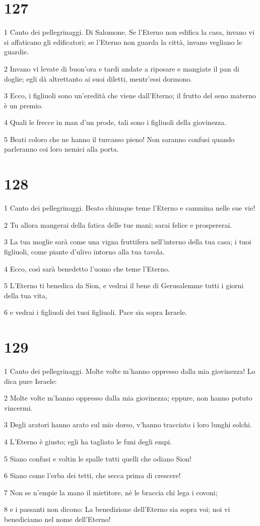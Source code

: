 \chapter{127}

\par 1 Canto dei pellegrinaggi. Di Salomone. Se l'Eterno non edifica la casa, invano vi si affaticano gli edificatori; se l'Eterno non guarda la città, invano vegliano le guardie.
\par 2 Invano vi levate di buon'ora e tardi andate a riposare e mangiate il pan di doglie; egli dà altrettanto ai suoi diletti, mentr'essi dormono.
\par 3 Ecco, i figliuoli sono un'eredità che viene dall'Eterno; il frutto del seno materno è un premio.
\par 4 Quali le frecce in man d'un prode, tali sono i figliuoli della giovinezza.
\par 5 Beati coloro che ne hanno il turcasso pieno! Non saranno confusi quando parleranno coi loro nemici alla porta.

\chapter{128}

\par 1 Canto dei pellegrinaggi. Beato chiunque teme l'Eterno e cammina nelle sue vie!
\par 2 Tu allora mangerai della fatica delle tue mani; sarai felice e prospererai.
\par 3 La tua moglie sarà come una vigna fruttifera nell'interno della tua casa; i tuoi figliuoli, come piante d'ulivo intorno alla tua tavola.
\par 4 Ecco, così sarà benedetto l'uomo che teme l'Eterno.
\par 5 L'Eterno ti benedica da Sion, e vedrai il bene di Gerusalemme tutti i giorni della tua vita,
\par 6 e vedrai i figliuoli dei tuoi figliuoli. Pace sia sopra Israele.

\chapter{129}

\par 1 Canto dei pellegrinaggi. Molte volte m'hanno oppresso dalla mia giovinezza! Lo dica pure Israele:
\par 2 Molte volte m'hanno oppresso dalla mia giovinezza; eppure, non hanno potuto vincermi.
\par 3 Degli aratori hanno arato sul mio dorso, v'hanno tracciato i loro lunghi solchi.
\par 4 L'Eterno è giusto; egli ha tagliato le funi degli empi.
\par 5 Siano confusi e voltin le spalle tutti quelli che odiano Sion!
\par 6 Siano come l'erba dei tetti, che secca prima di crescere!
\par 7 Non se n'empie la mano il mietitore, né le braccia chi lega i covoni;
\par 8 e i passanti non dicono: La benedizione dell'Eterno sia sopra voi; noi vi benediciamo nel nome dell'Eterno!

